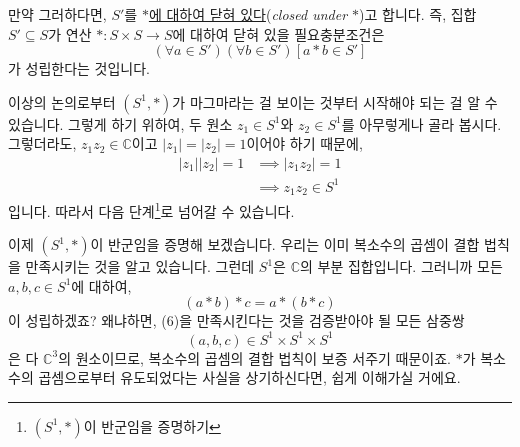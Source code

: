 \documentclass[12pt]{paper}
\begin{document}
  만약 그러하다면, $S'$를 \underline{$*$에 대하여 닫혀 있다}(\textit{closed under $*$})고 합니다.
  즉, 집합 $S' \subseteq S$가 연산 $* : S \times S \to S$에 대하여 닫혀 있을 필요충분조건은
  $$ \left( \forall a \in S' \right) \left( \forall b \in S' \right) \left[ a * b \in S' \right] $$
  가 성립한다는 것입니다.

  이상의 논의로부터 $\left( S^1 , * \right)$가 마그마라는 걸 보이는 것부터 시작해야 되는 걸 알 수 있습니다.
  그렇게 하기 위하여, 두 원소 $z_1 \in S^1$와 $z_2 \in S^1$를 아무렇게나 골라 봅시다.
  그렇더라도, $ z_1 z_2 \in \mathbb{C} $이고 $\left| z_1 \right| = \left| z_2 \right| = 1$이어야 하기 때문에,
  \begin{align*}
    \left| z_1 \right| \left| z_2 \right| = 1
    & \implies \left| z_1 z_2 \right| = 1 \\
    & \implies z_1 z_2 \in S^1
  \end{align*}
  입니다.
  따라서 다음 단계\footnote{$\left( S^1 , * \right)$이 반군임을 증명하기}로 넘어갈 수 있습니다.

  이제 $\left( S^1 , * \right)$이 반군임을 증명해 보겠습니다.
  우리는 이미 복소수의 곱셈이 결합 법칙을 만족시키는 것을 알고 있습니다.
  그런데 $S^1$은 $\mathbb{C}$의 부분 집합입니다.
  그러니까 모든 $a , b , c \in S^1$에 대하여, 
  \begin{equation*}
    (a * b) * c = a * (b * c) \tag{6}
  \end{equation*}
  이 성립하겠죠?
  왜냐하면, (6)을 만족시킨다는 것을 검증받아야 될 모든 삼중쌍 $$ \left( a , b , c \right) \in S^1 \times S^1 \times S^1 $$은 다 $\mathbb{C}^{3}$의 원소이므로,
  복소수의 곱셈의 결합 법칙이 보증 서주기 때문이죠.
  $*$가 복소수의 곱셈으로부터 유도되었다는 사실을 상기하신다면,
  쉽게 이해가실 거에요.

  

  
\end{document}
